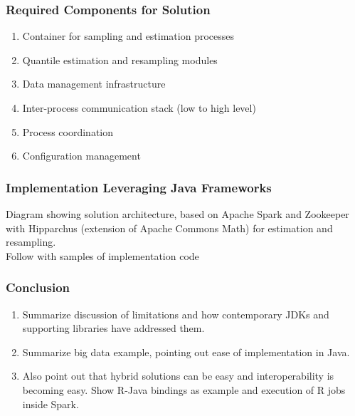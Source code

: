 \documentclass[14pt,mathserif]{beamer}
\begin{document}
\begin{frame}
  \frametitle{Required Components for Solution}
  \begin{enumerate}
  \item Container for sampling and estimation processes
  \item Quantile estimation and resampling modules
  \item Data management infrastructure
  \item Inter-process communication stack (low to high level)
  \item Process coordination
  \item Configuration management
  \end{enumerate}
\end{frame}
  
\begin{frame}
  \frametitle{Implementation Leveraging Java Frameworks}
Diagram showing solution architecture, based on Apache Spark and Zookeeper with Hipparchus (extension of Apache Commons Math) for estimation and resampling.
\\
Follow with samples of implementation code
\end{frame}

\begin{frame}
  \frametitle{Conclusion}
\begin{enumerate}
\item Summarize discussion of limitations and how contemporary JDKs and supporting libraries have addressed them.
\item Summarize big data example, pointing out ease of implementation in Java.  
\item Also point out that hybrid solutions can be easy and interoperability is becoming easy.  Show R-Java bindings as example and execution of R jobs inside Spark.
\end{enumerate}
\end{frame}
\end{document}
